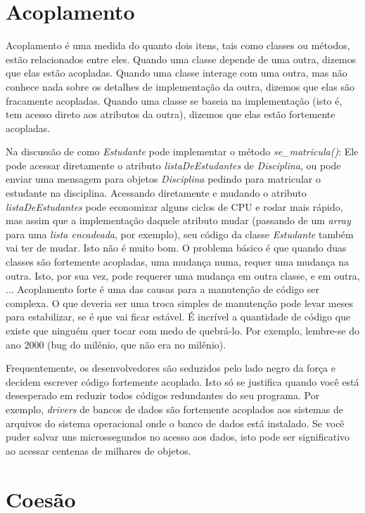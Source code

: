 \documentclass[
	11pt,				%
	openright,
	twoside,			%
	a4paper,			%
	english,			%
	french,
	brazil,				%
	sumario=tradicional
	]{abntex2}
\begin{document}
\section{Acoplamento}

Acoplamento é uma medida do quanto dois itens, tais como classes ou métodos, estão relacionados entre eles. Quando uma classe depende de uma outra, dizemos que elas estão acopladas. Quando uma classe interage com uma outra, mas não conhece nada sobre os detalhes de implementação da outra, dizemos que elas são fracamente acopladas. Quando uma classe se baseia na implementação (isto é, tem acesso direto aos atributos da outra), dizemos que elas estão fortemente acopladas.

Na discussão de como \emph{Estudante} pode implementar o método \emph{se\_matricula()}: Ele pode acessar diretamente o atributo \emph{listaDeEstudantes} de \emph{Disciplina}, ou pode enviar uma mensagem para objetos \emph{Disciplina} pedindo para matricular o estudante na disciplina. Acessando diretamente e mudando o atributo \emph{listaDeEstudantes} pode economizar alguns ciclos de CPU e rodar mais rápido, mas assim que a implementação daquele atributo mudar (passando de um \textit{array} para uma \textit{lista encadeada}, por exemplo), seu código da classe \emph{Estudante} também vai ter de mudar. Isto não é muito bom. O problema básico é que quando duas classes são fortemente acopladas, uma mudança numa, requer uma mudança na outra. Isto, por sua vez, pode requerer uma mudança em outra classe, e em outra, ... Acoplamento forte é uma das causas para a manutenção de código ser complexa. O que deveria ser uma troca simples de manutenção pode levar meses para estabilizar, se é que vai ficar estável. É incrível a quantidade de código que existe que ninguém quer tocar com medo de quebrá-lo. Por exemplo, lembre-se do ano 2000 (bug do milênio, que não era no milênio).

Frequentemente, os desenvolvedores são seduzidos pelo lado negro da força e decidem escrever código fortemente acoplado. Isto só se justifica quando você está desesperado em reduzir todos códigos redundantes do seu programa. Por exemplo, \textit{drivers} de bancos de dados são fortemente acoplados aos sistemas de arquivos do sistema operacional onde o banco de dados está instalado. Se você puder salvar uns microssegundos no acesso aos dados, isto pode ser significativo ao acessar centenas de milhares de objetos.

\section{Coesão}
\end{document}
